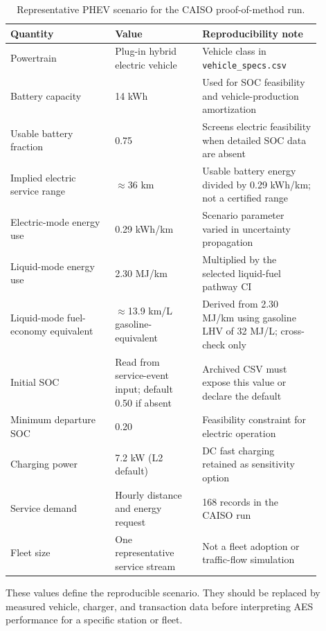 \documentclass[cleantechnol,article,submit,pdftex,moreauthors]{Definitions/mdpi}
\begin{document}
\begin{table}[htbp]
	\centering
	\begin{threeparttable}
		\caption{Representative PHEV scenario for the CAISO proof-of-method run.}
		\label{tab:phev_scenario}
		\scriptsize
		\begin{tabular}{p{0.30\linewidth}p{0.25\linewidth}p{0.34\linewidth}}
			\toprule
			Quantity & Value & Reproducibility note \\
			\midrule
			Powertrain & Plug-in hybrid electric vehicle & Vehicle class in \texttt{vehicle\_specs.csv} \\
			Battery capacity & 14 kWh & Used for SOC feasibility and vehicle-production amortization \\
			Usable battery fraction & 0.75 & Screens electric feasibility when detailed SOC data are absent \\
			Implied electric service range & $\approx$36 km & Usable battery energy divided by 0.29 kWh/km; not a certified range \\
			Electric-mode energy use & 0.29 kWh/km & Scenario parameter varied in uncertainty propagation \\
			Liquid-mode energy use & 2.30 MJ/km & Multiplied by the selected liquid-fuel pathway CI \\
			Liquid-mode fuel-economy equivalent & $\approx$13.9 km/L gasoline-equivalent & Derived from 2.30 MJ/km using gasoline LHV of 32 MJ/L; cross-check only \\
			Initial SOC & Read from service-event input; default 0.50 if absent & Archived CSV must expose this value or declare the default \\
			Minimum departure SOC & 0.20 & Feasibility constraint for electric operation \\
			Charging power & 7.2 kW (L2 default) & DC fast charging retained as sensitivity option \\
			Service demand & Hourly distance and energy request & 168 records in the CAISO run \\
			Fleet size & One representative service stream & Not a fleet adoption or traffic-flow simulation \\
			\bottomrule
		\end{tabular}
		\begin{tablenotes}
			\footnotesize
			\item These values define the reproducible scenario. They should be replaced by measured vehicle, charger, and transaction data before interpreting AES performance for a specific station or fleet.
		\end{tablenotes}
	\end{threeparttable}
\end{table}
\end{document}
